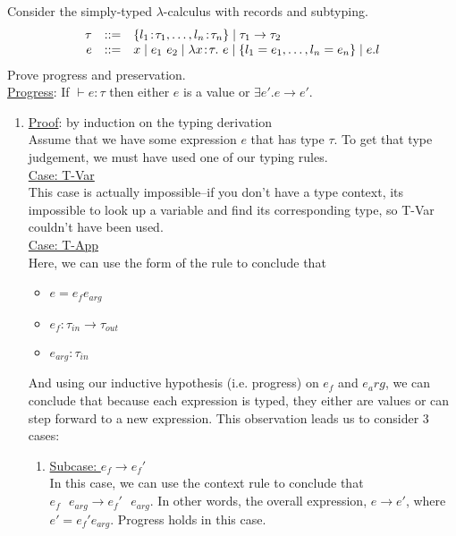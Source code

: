 \documentclass[10pt]{article}
\begin{document}
\begin{exercise}
  Consider the simply-typed $\lambda$-calculus with records and
  subtyping.
%
\[
\begin{array}{rcl}
\tau & ::= & \{ l_1 \!:\! \tau_1, \dots, l_n \!:\! \tau_n \} \mid \tau_1 \rightarrow \tau_2\\
e    & ::= & x \mid e_1~e_2 \mid \lambda x \!:\!\tau .~ e \mid \{ l_1 = e_1 , \dots, l_n = e_n \} \mid e.l\\
\end{array}
\]
%
Prove progress and preservation. \\

\noindent \underline{Progress}: If $\vdash e:\tau$ then either $e$ is a value or $\exists e'. e \rightarrow e'$. \\

\begin{enumerate}[\hspace{20pt}]

\item 
\underline{Proof}: by induction on the typing derivation \\

Assume that we have some expression $e$ that has type $\tau$. To get that type 
judgement, we must have used one of our typing rules. \\


\underline{Case: T-Var} \\
This case is actually impossible--if you don't have a type context, its impossible to look up a variable and find its corresponding type, so T-Var couldn't have been used. \checkmark \checkmark \\

\underline{Case: T-App} \\
Here, we can use the form of the rule to conclude that 
\begin{itemize}
	\item $e = e_f e_{arg}$
	\item $e_f: \tau_{in} \rightarrow \tau_{out}$
	\item $e_{arg}: \tau_{in}$
\end{itemize}

And using our inductive hypothesis (i.e. progress) on $e_f$ and $e_arg$, we can conclude that because each expression is typed, they either are values or can step
forward to a new expression. This observation leads us to consider 3 cases:\\

\begin{enumerate}[\hspace{20pt}]
	\item
	\underline{Subcase: $e_f \rightarrow e_f'$} \\
	In this case, we can use the context
	rule to conclude that $e_f \text{ } e_{arg} \rightarrow e_f' \text{ } e_{arg}$. 
	In other words, the
	overall expression, $e \rightarrow e'$, where $e' = e_f' e_{arg}$. Progress holds
	in this case. \checkmark \\
	

\end{enumerate}
\end{enumerate}
\end{exercise}
\end{document}
